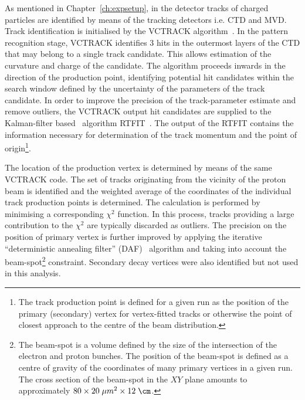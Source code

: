 As mentioned in Chapter~\ref{ch:expsetup}, in the \zeus detector tracks of charged particles are identified by means of the tracking detectors i.e. CTD and MVD. Track identification is initialised by the VCTRACK algorithm~\cite{upub:hartner:zn9858,upub:hartner:zn9764}. In the pattern recognition stage, VCTRACK identifies 3 hits in the outermost layers of the CTD that may belong to a single track candidate. This allows estimation of the curvature and charge of the candidate. The algorithm proceeds inwards in the direction of the production point, identifying potential hit candidates within the search window defined by the uncertainty of the parameters of the track candidate. In order to improve the precision of the track-parameter estimate and remove outliers, the VCTRACK output hit candidates are supplied to the Kalman-filter based~\cite{Klaman:1960} algorithm RTFIT~\cite{upub:spiridonov:rtfit}. The output of the RTFIT contains the information necessary for determination of the track momentum and the point of origin\footnote{The track production point is defined for a given run as the position of the primary (secondary) vertex for vertex-fitted tracks or otherwise the point of closest approach to the centre of the beam distribution.}.

The location of the production vertex is determined by means of the same VCTRACK code. The set of tracks originating from the vicinity of the proton beam is identified and the weighted average of the coordinates of the individual track production points is determined. The calculation is performed by minimising a corresponding $\chi^2$ function. In this process, tracks providing a large contribution to the $\chi^2$ are typically discarded as outliers. The precision on the position of primary vertex is further improved by applying the iterative ``deterministic annealing filter'' (DAF)~\cite{Fruewirth:2010} algorithm and taking into account the beam-spot\footnote{The beam-spot is a volume defined by the size of the intersection of the electron and proton bunches. The position of the beam-spot is defined as a centre of gravity of the coordinates of many primary vertices in a given run. The cross section of the beam-spot in the $XY$ plane amounts to approximately $80 \times 20\; \mu m^{2} \times 12\; \cm$.} constraint. Secondary decay vertices were also identified but not used in this analysis.
